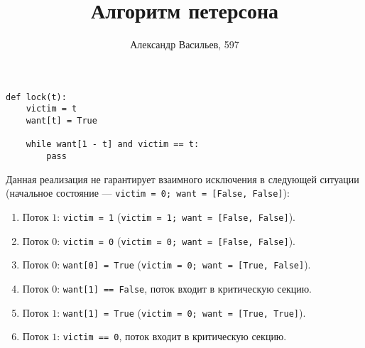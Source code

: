 \documentclass[a4paper]{paper}
\title{Алгоритм петерсона}
\author{Александр Васильев, 597}
\begin{document}
 
\maketitle

\begin{lstlisting}
def lock(t):
    victim = t
    want[t] = True

    while want[1 - t] and victim == t:
        pass
\end{lstlisting}
Данная реализация не гарантирует взаимного исключения в следующей ситуации
(начальное состояние --- \lstinline$victim = 0; want = [False, False]$):
\begin{enumerate}
\item Поток $1$: \lstinline$victim = 1$ (\lstinline$victim = 1; want = [False, False]$).
\item Поток $0$: \lstinline$victim = 0$ (\lstinline$victim = 0; want = [False, False]$).
\item Поток $0$: \lstinline$want[0] = True$ (\lstinline$victim = 0; want = [True, False]$).
\item Поток $0$: \lstinline$want[1] == False$, поток входит в критическую секцию.
\item Поток $1$: \lstinline$want[1] = True$ (\lstinline$victim = 0; want = [True, True]$).
\item Поток $1$: \lstinline$victim == 0$, поток входит в критическую секцию.
\end{enumerate}
\end{document}
